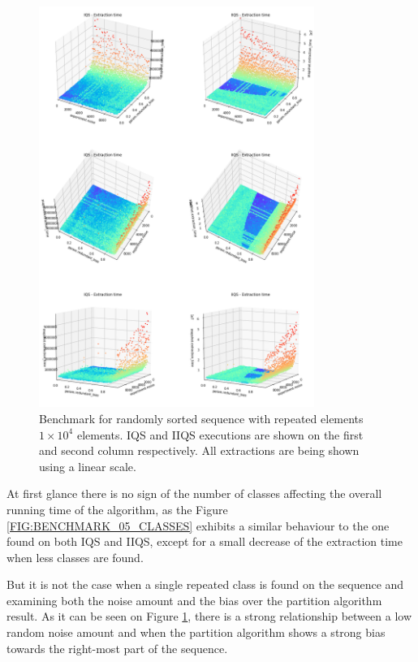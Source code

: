 \begin{figure}[!ht]
    \centering
    \includegraphics[width=0.8\textwidth]{./fragments/04_experimental_execution/images/01_basebenchmark_06_noise_bias.png}
    \caption{Benchmark for randomly sorted sequence with repeated elements $1\times10^4$ elements. IQS and IIQS executions are shown on the first and second column respectively. All extractions are being shown using a linear scale.}
    \label{FIG:BENCHMARK_06_NOISE_BIAS}
\end{figure}

At first glance there is no sign of the number of classes affecting the overall running time of the algorithm, as the Figure \ref{FIG:BENCHMARK_05_CLASSES} exhibits a similar behaviour to the one found on both IQS and IIQS, except for a small decrease of the extraction time when less classes are found.

But it is not the case when a single repeated class is found on the sequence and examining  both the noise amount and the bias over the partition algorithm result. As it can be seen on Figure \ref{FIG:BENCHMARK_06_NOISE_BIAS}, there is a strong relationship between a low random noise amount and when the partition algorithm shows a strong bias towards the right-most part of the sequence.

